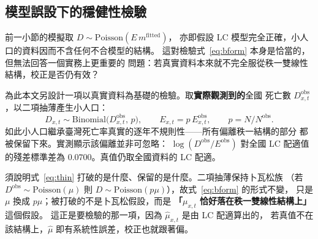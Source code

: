 \documentclass[UTF8, fontset=macnew, a4paper, 12pt]{ctexart}
\begin{document}
\subsection{模型誤設下的穩健性檢驗}\label{sec:real}

前一小節的模擬取 $D\sim\text{Poisson}(E\,m^{\text{fitted}})$，
亦即假設 LC 模型完全正確，小人口的資料因而不含任何不合模型的結構。
這對檢驗式~\eqref{eq:bform} 本身是恰當的，但無法回答一個實務上更重要的
問題：若真實資料本來就不完全服從秩一雙線性結構，校正是否仍有效？

為此本文另設計一項以真實資料為基礎的檢驗。取\textbf{實際觀測到的}全國
死亡數 $D^{\text{obs}}_{x,t}$，以二項抽薄產生小人口：
\begin{equation}\label{eq:thin}
D_{x,t}\sim\text{Binomial}\big(D^{\text{obs}}_{x,t},\,p\big),\qquad
E_{x,t}=p\,E^{\text{obs}}_{x,t},\qquad p=N/N^{\text{obs}} .
\end{equation}
如此小人口繼承臺灣死亡率真實的逐年不規則性——所有偏離秩一結構的部分
都被保留下來。實測顯示該偏離並非可忽略：
$\log(D^{\text{obs}}/E^{\text{obs}})$ 對全國 LC 配適值的殘差標準差為
$0.0700$。真值仍取全國資料的 LC 配適。

須說明式~\eqref{eq:thin} 打破的是什麼、保留的是什麼。二項抽薄保持卜瓦松族
（若 $D^{\text{obs}}\sim\text{Poisson}(\mu)$ 則
$D\sim\text{Poisson}(p\mu)$），故式~\eqref{eq:bform} 的形式不變，
只是 $\mu$ 換成 $p\mu$；被打破的不是卜瓦松假設，而是
\textbf{「$\mu_{x,t}$ 恰好落在秩一雙線性結構上」}這個假設。
這正是要檢驗的那一項，因為 $\hat\mu_{x,t}$ 是由 LC 配適算出的，
若真值不在該結構上，$\hat\mu$ 即有系統性誤差，校正也就跟著偏。
\end{document}
